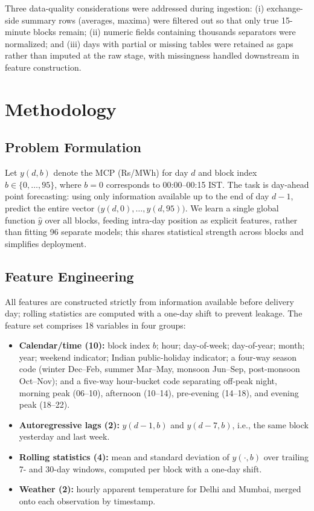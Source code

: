 \documentclass[preprint,12pt]{elsarticle}
\newcommand{\Rs}{Rs}
\begin{document}
\begin{enumerate}
Three data-quality considerations were addressed during ingestion: (i) exchange-side summary rows (averages, maxima) were filtered out so that only true 15-minute blocks remain; (ii) numeric fields containing thousands separators were normalized; and (iii) days with partial or missing tables were retained as gaps rather than imputed at the raw stage, with missingness handled downstream in feature construction.

\section{Methodology}\label{sec:method}

\subsection{Problem Formulation}\label{sec:formulation}

Let $y(d,b)$ denote the MCP (\Rs/MWh) for day $d$ and block index $b \in \{0,\dots,95\}$, where $b=0$ corresponds to 00:00--00:15 IST. The task is day-ahead point forecasting: using only information available up to the end of day $d-1$, predict the entire vector $\bigl(y(d,0),\dots,y(d,95)\bigr)$. We learn a single global function $\hat{y}$ over all blocks, feeding intra-day position as explicit features, rather than fitting 96 separate models; this shares statistical strength across blocks and simplifies deployment.

\subsection{Feature Engineering}\label{sec:features}

All features are constructed strictly from information available before delivery day; rolling statistics are computed with a one-day shift to prevent leakage. The feature set comprises 18 variables in four groups:

\begin{itemize}
  \item \textbf{Calendar/time (10):} block index $b$; hour; day-of-week; day-of-year; month; year; weekend indicator; Indian public-holiday indicator; a four-way season code (winter Dec--Feb, summer Mar--May, monsoon Jun--Sep, post-monsoon Oct--Nov); and a five-way hour-bucket code separating off-peak night, morning peak (06--10), afternoon (10--14), pre-evening (14--18), and evening peak (18--22).
  \item \textbf{Autoregressive lags (2):} $y(d-1,b)$ and $y(d-7,b)$, i.e., the same block yesterday and last week.
  \item \textbf{Rolling statistics (4):} mean and standard deviation of $y(\cdot,b)$ over trailing 7- and 30-day windows, computed per block with a one-day shift.
  \item \textbf{Weather (2):} hourly apparent temperature for Delhi and Mumbai, merged onto each observation by timestamp.
\end{itemize}


\end{enumerate}
\end{document}
